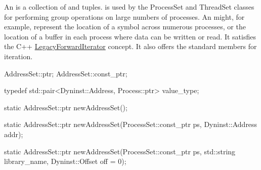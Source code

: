 
An  is a collection of  and
 tuples.  is used by the
ProcessSet and ThreadSet
classes for performing group operations on large numbers of processes. An
 might, for example, represent the location of a symbol across
numerous processes, or the location of a buffer in each process where data can
be written or read.  It satisfies the C++
\href{https://en.cppreference.com/cpp/named_req/ForwardIterator}{LegacyForwardIterator}
concept. It also offers the standard  members for iteration.

\begin{apient}
AddressSet::ptr;
AddressSet::const_ptr;
\end{apient}


\begin{apient}
typedef std::pair<Dyninst::Address, Process::ptr> value_type;
\end{apient}

\apidesc{
}

\begin{apient}
static AddressSet::ptr newAddressSet();
\end{apient}


\begin{apient}
static AddressSet::ptr newAddressSet(ProcessSet::const_ptr ps, Dyninst::Address addr);
\end{apient}


\begin{apient}
static AddressSet::ptr newAddressSet(ProcessSet::const_ptr ps,
                                     std::string library_name,
                                     Dyninst::Offset off = 0);
\end{apient}



